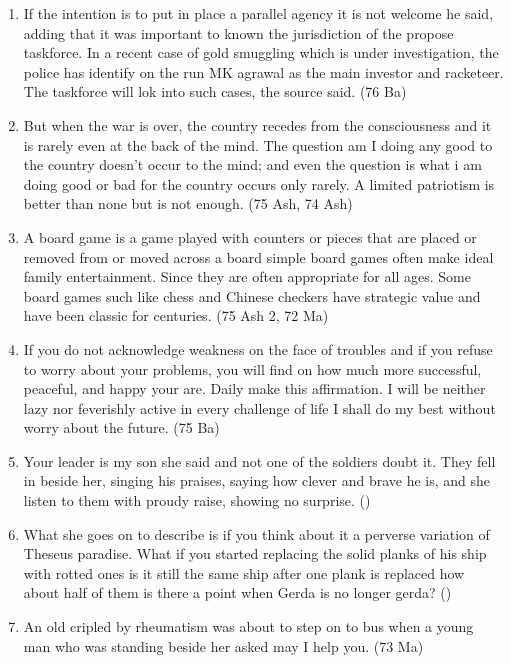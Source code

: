 \documentclass[12pt]{article}
\begin{document}
\begin{enumerate}
      \item If the intention is to put in place a parallel agency it is not welcome he said, adding that it was important to known the jurisdiction of the propose taskforce. In a recent case of gold smuggling which is under investigation, the police has identify on the run MK agrawal as the main investor and racketeer. The taskforce will lok into such cases, the source said. \hfill (76 Ba)

      \item But when the war is over, the country recedes from the consciousness and it is rarely even at the back of the mind. The question am I doing any good to the country doesn't occur to the mind; and even the question is what i am doing good or bad for the country occurs only rarely. A limited patriotism is better than none but is not enough. \hfill (75 Ash, 74 Ash)

      \item A board game is a game played with counters or pieces that are placed or removed from or moved across a board simple board games often make ideal family entertainment. Since they are often appropriate for all ages. Some board games such like chess and Chinese checkers have strategic value and have been classic for centuries. \hfill (75 Ash 2, 72 Ma)

      \item If you do not acknowledge weakness on the face of troubles and if you refuse to worry about your problems, you will find on how much more successful, peaceful, and happy your are. Daily make this affirmation. I will be neither lazy nor feverishly active in every challenge of life I shall do my best without worry about the future. \hfill (75 Ba)

      \item Your leader is my son she said and not one of the soldiers doubt it. They fell in beside her, singing his praises, saying how clever and brave he is, and she listen to them with proudy raise, showing no surprise. \hfill ()

      \item What she goes on to describe is if you think about it a perverse variation of Theseus paradise. What if you started replacing the solid planks of his ship with rotted ones is it still the same ship after one plank is replaced how about half of them is there a point when Gerda is no longer gerda? \hfill ()

      \item An old cripled by rheumatism was about to step on to bus when a young man who was standing beside her asked may I help you. \hfill (73 Ma)


\end{enumerate}
\end{document}
